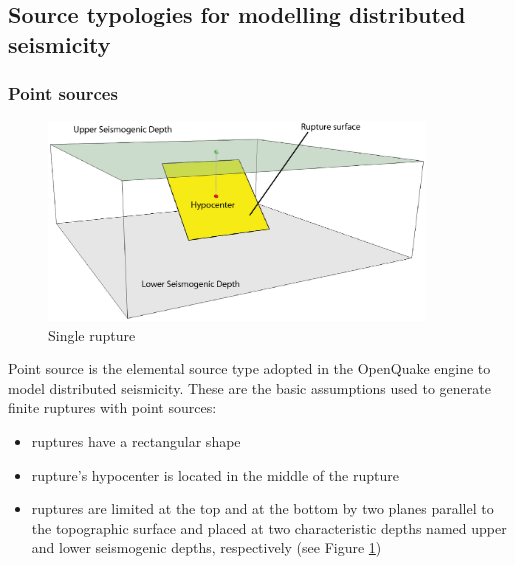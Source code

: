 \subsection{Source typologies for modelling distributed seismicity}
\subsubsection{Point sources}
\label{hazard:seismic_source_types:pointSources}
\begin{figure}[!ht]
\centering
\includegraphics[width=10cm]{./figures/hazard/single_rupture.eps}
\caption{Single rupture}
\label{fig:single_rupture}
\end{figure}
Point source is the elemental source type adopted in the OpenQuake engine 
to model distributed seismicity. These are the basic assumptions used to 
generate finite ruptures with point sources:
\begin{itemize}
	\item ruptures have a rectangular shape
	\item rupture's hypocenter is located in the middle of the rupture
	\item ruptures are limited at the top and at the bottom by two planes 
	parallel to the topographic surface and placed at two characteristic 
	depths named upper and lower seismogenic depths, respectively (see 
	Figure \ref{fig:single_rupture})
\end{itemize} 
%
